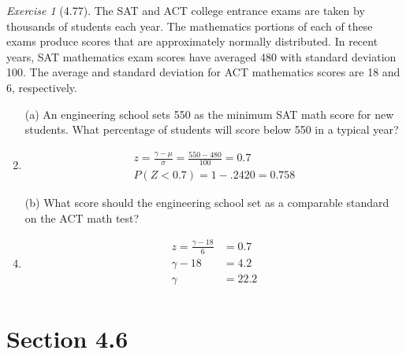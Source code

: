\documentclass[12pt]{amsart}
\makeatletter
\theoremstyle{remark}
\newtheorem*{exercise}{Exercise}%
\renewenvironment{proof}[1][\proofname]{\par\doublespacing
  \pushQED{\qed}%
  \normalfont \topsep6\p@\@plus6\p@\relax
  \list{}{%
    \settowidth{\leftmargin}{\itshape\proofname:\hskip\labelsep}%
    \setlength{\labelwidth}{0pt}%
    \setlength{\itemindent}{-\leftmargin}%
  }%
  \item[\hskip\labelsep\itshape#1\@addpunct{:}]\ignorespaces
}{%
  \popQED\endlist\@endpefalse
  \singlespacing
}
\theoremstyle{mycomment}
\makeatother
\begin{document}
\begin{exercise}[4.77]
The SAT and ACT college entrance exams are taken by thousands of students each year. The mathematics portions of each of these exams produce scores that are approximately normally distributed. In recent years, SAT mathematics exam scores have averaged 480 with standard deviation 100. The average and standard deviation for ACT mathematics scores are 18 and 6, respectively.

\begin{enumerate}
    \item[(a)] An engineering school sets 550 as the minimum SAT math score for new students. What percentage of students will score below 550 in a typical year?
\begin{proof}[Solution]
  \begin{align*}
    z = \frac{\gamma - \mu}{\sigma} = \frac{550 - 480}{100} = 0.7 \\
    P(Z < 0.7) = 1 - .2420 = 0.758 
  \end{align*}
\end{proof}
    \item[(b)] What score should the engineering school set as a comparable standard on the ACT math test?
\begin{proof}[Solution]
  \begin{align*}
    z = \frac{\gamma - 18}{6} &= 0.7 \\
    \gamma - 18 &= 4.2 \\
    \gamma &= 22.2 \\
  \end{align*}
\end{proof}
\end{enumerate}
\end{exercise}
\section*{Section 4.6}
\end{document}
